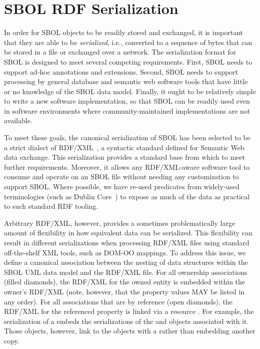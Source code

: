 \section{SBOL RDF Serialization}
\label{sec:serialization}

In order for SBOL objects to be readily stored and exchanged, it is important that they are able to be {\em serialized}, i.e., converted to a sequence of bytes that can be stored in a file or exchanged over a network.  The serialization format for SBOL is designed to meet several competing requirements. 
First, SBOL needs to support ad-hoc annotations and extensions. 
Second, SBOL needs to support processing by general database and semantic web software tools that have little or no knowledge of the SBOL data model. 
Finally, it ought to be relatively simple to write a new software implementation, so that SBOL can be readily used even in software environments where community-maintained implementations are not available.

To meet these goals, the canonical serialization of SBOL has been selected to be a strict dialect of RDF/XML~\cite{rdfxml}, a syntactic standard defined for Semantic Web data exchange. 
This serialization provides a standard base from which to meet further requirements. 
Moreover, it allows any RDF/XML-aware software tool to consume and operate on an SBOL file without needing any customization to support SBOL. Where possible, we have re-used predicates from widely-used terminologies (such as Dublin Core~\cite{dcmi2012}) to expose as much of the data as practical to such standard RDF tooling.

Arbitrary RDF/XML, however, provides a sometimes problematically large amount of flexibility in how equivalent data can be serialized. This flexibility can result in different serializations when processing RDF/XML files using standard off-the-shelf XML tools, such as DOM-OO mappings. 
To address this issue, we define a canonical association between the nesting of data structures within the SBOL UML data model and the RDF/XML file. 
For all ownership associations (filled diamonds), the RDF/XML for the owned entity is embedded within the owner's RDF/XML (note, however, that the property values MAY be listed in any order).
For all associations that are by reference (open diamonds), the RDF/XML for the referenced property is linked via a resource .
For example, the serialization of a  embeds the serializations of the  and  objects associated with it. Those  objects, however, link to the  objects with a  rather than embedding another copy.

